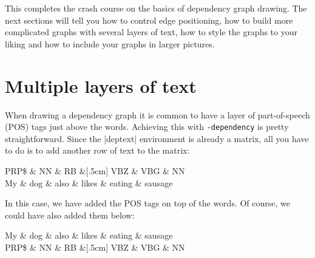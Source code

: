 \documentclass[a4paper]{ltxdoc}
\def\pkgname{\tikzname{}\texttt{-dependency}}
\begin{document}
This completes the crash course on the basics of dependency graph drawing. The next sections will tell you how to control edge positioning, how to build more complicated graphs with several layers of text, how to style the graphs to your liking and how to include your graphs in larger pictures.

\section{Multiple layers of text}

When drawing a dependency graph it is common to have a layer of part-of-speech (POS) tags just above the words. Achieving this with \pkgname{} is pretty straightforward. Since the |deptext| environment is already a matrix, all you have to do is to add another row of text to the matrix:

\begin{codeexample}[]
\begin{dependency}
   \begin{deptext}[column sep=.5cm]
      PRP\$ \& NN \& RB \&[.5cm] VBZ \& VBG \& NN \\
      My \& dog \& also \& likes \& eating \& sausage \\
   \end{deptext}
\end{dependency}
\end{codeexample}

In this case, we have added the POS tags on top of the words. Of course, we could have also added them below:

\begin{codeexample}[]
\begin{dependency}
   \begin{deptext}[column sep=.7cm]
      My \& dog \& also \& likes \& eating \& sausage \\
      PRP\$ \& NN \& RB \&[.5cm] VBZ \& VBG \& NN \\
   \end{deptext}
\end{dependency}
\end{codeexample}
\end{document}
